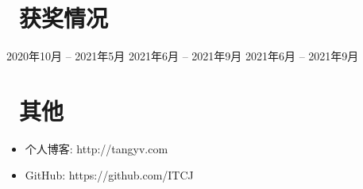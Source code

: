\documentclass{resume}
\begin{document}
\section{\faHeartO\ 获奖情况}
      {2020年10月 -- 2021年5月}
  {2021年6月 -- 2021年9月}
                {2021年6月 -- 2021年9月}

\section{\faInfo\ 其他}
\begin{itemize}[parsep=0.5ex]
  \item 个人博客: http://tangyv.com
  \item GitHub: https://github.com/ITCJ
\end{itemize}

%
%
\end{document}
